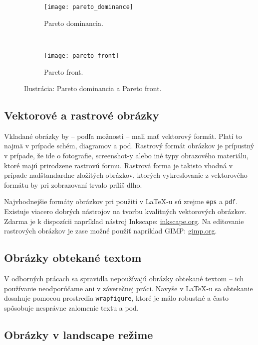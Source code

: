 \begin{figure}
\centering
\begin{subfigure}[c]{0.5\textwidth}
	\centering
	\texttt{[image: pareto\_dominance]}
	\caption{Pareto dominancia.}
	\label{fig:subfig1}
\end{subfigure}~
\begin{subfigure}[c]{0.5\textwidth}
	\centering
	\texttt{[image: pareto\_front]}
	\caption{Pareto front.}
	\label{fig:subfig2}
\end{subfigure}
\caption{Ilustrácia: Pareto dominancia a Pareto front.}
\label{fig:fig_with_subfigs}
\end{figure}

\subsection{Vektorové a rastrové obrázky}

Vkladané obrázky by -- podľa možnosti -- mali mať vektorový formát. Platí to najmä v prípade schém, diagramov a pod. Rastrový formát obrázkov je prípustný v prípade, že ide o fotografie, screenshot-y alebo iné typy obrazového materiálu, ktoré majú prirodzene rastrovú formu. Rastrová forma je takisto vhodná v prípade nadštandardne zložitých obrázkov, ktorých vykresľovanie z vektorového formátu by pri zobrazovaní trvalo príliš dlho.

Najvhodnejšie formáty obrázkov pri použití v LaTeX-u sú zrejme \texttt{eps} a \texttt{pdf}. Existuje viacero dobrých nástrojov na tvorbu kvalitných vektorových obrázkov. Zdarma je k dispozícii napríklad nástroj Inkscape: \href{https://inkscape.org/en/}{inkscape.org}. Na editovanie rastrových obrázkov je zase možné použiť napríklad GIMP: \href{https://www.gimp.org/}{gimp.org}.

\subsection{Obrázky obtekané textom}

V odborných prácach sa spravidla nepoužívajú obrázky obtekané textom -- ich používanie neodporúčame ani v záverečnej práci. Navyše v LaTeX-u sa obtekanie dosahuje pomocou prostredia \texttt{wrapfigure}, ktoré je málo robustné a často spôsobuje nesprávne zalomenie textu a pod.

\subsection{Obrázky v landscape režime}


